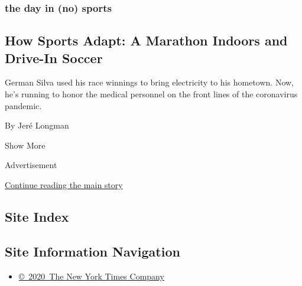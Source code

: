 \begin{enumerate}
  \hypertarget{the-day-in-no-sports}{%
  \subsubsection{the day in (no) sports}\label{the-day-in-no-sports}}

  \hypertarget{how-sports-adapt-a-marathon-indoors-and-drive-in-soccer}{%
  \subsection{How Sports Adapt: A Marathon Indoors and Drive-In
  Soccer}\label{how-sports-adapt-a-marathon-indoors-and-drive-in-soccer}}

  German Silva used his race winnings to bring electricity to his
  hometown. Now, he's running to honor the medical personnel on the
  front lines of the coronavirus pandemic.

  By Jeré Longman
\end{enumerate}

Show More

Advertisement

\protect\hyperlink{after-mid2}{Continue reading the main story}

\hypertarget{site-index}{%
\subsection{Site Index}\label{site-index}}

\hypertarget{site-information-navigation}{%
\subsection{Site Information
Navigation}\label{site-information-navigation}}

\begin{itemize}
\tightlist
\item
  \href{https://help.nytimes3xbfgragh.onion/hc/en-us/articles/115014792127-Copyright-notice}{©~2020~The
  New York Times Company}
\end{itemize}

